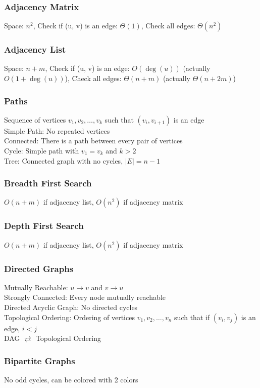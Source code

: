 \documentclass{article}
\begin{document}
\begin{multicols*}{2}
        \subsubsection*{Adjacency Matrix}
        Space: $n^2$, Check if (u, v) is an edge: $\Theta(1)$, Check all edges: $\Theta(n^2)$
        \subsubsection*{Adjacency List}
        Space: $n + m$, Check if (u, v) is an edge: $O(\deg(u))$ (actually $O(1 + \deg(u))$), Check
        all edges: $\Theta(n + m)$ (actually $\Theta(n + 2m)$)
        \subsubsection*{Paths}
        Sequence of vertices $v_1, v_2, \dots, v_k$ such that $(v_i, v_{i+1})$ is an edge\\
        Simple Path: No repeated vertices\\
        Connected: There is a path between every pair of vertices\\
        Cycle: Simple path with $v_1 = v_k$ and $k > 2$\\
        Tree: Connected graph with no cycles, $\lvert E \rvert = n - 1$
        \subsubsection*{Breadth First Search}
        $O(n + m)$ if adjacency list, $O(n^2)$ if adjacency matrix
        \subsubsection*{Depth First Search}
        $O(n + m)$ if adjacency list, $O(n^2)$ if adjacency matrix
        \subsubsection*{Directed Graphs}
        Mutually Reachable: $u \to v$ and $v \to u$\\
        Strongly Connected: Every node mutually reachable\\
        Directed Acyclic Graph: No directed cycles\\
        Topological Ordering: Ordering of vertices $v_1, v_2, \ldots, v_n$ such that if $(v_i,
        v_j)$ is an edge, $i < j$\\
        DAG $\rightleftarrows$ Topological Ordering
        \subsubsection*{Bipartite Graphs}
        No odd cycles, can be colored with 2 colors

\end{multicols*}
\end{document}
